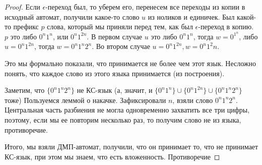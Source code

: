 \begin{proof}
Если $\epsilon$-переход был, то уберем его, перенесем все переходы из копии в исходный автомат, получили какое-то слово $u$ из ноликов и единичек.
Был какой-то префикс $p$ слова, который мы приняли перед тем, как был $\epsilon$-переход в копию.
$p$ это либо $0^n1^n$, или $0^n1^{2n}$. 
В первом случае $u$ это либо $0^n1^n$, тогда $w = 0^1^n$, либо $u=0^n1^{2n}$, тогда $w = 0^n1^n2^n$.
Во втором случае $u = 0^n1^{2n}, w = 0^n1^2n$. 

Это мы формально показали, что принимается не более чем этот язык. Несложно понять, что каждое слово из этого языка принимается (из построения).

Заметим, что $\{0^n1^n2^n\}$ не КС-язык (а, значит, и $\{0^n1^n\} \cup \{0^n1^{2n}\} \cup \{0^n1^n2^n\}$ тоже)
Пользуемся леммой о накачке. Зафиксировали $n$, взяли слово $0^n1^n2^n$. 
Центральная часть разбиения не могла одновременно захватить все три цифры, поэтому, если мы ее повторим несколько раз, то получим слово не из языка, противоречие.

Итого, мы взяли ДМП-автомат, получили, что он принимает то, что не принимает КС-язык, при этом мы знаем, что есть вложенность.
Противоречие
\end{proof}